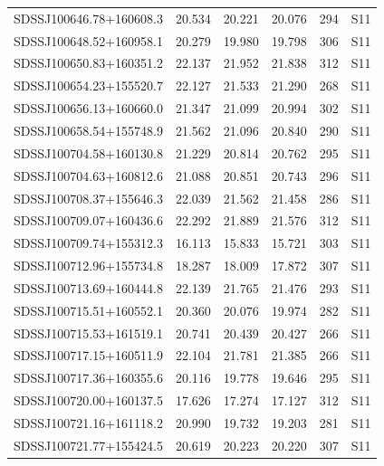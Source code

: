 \documentclass[manuscript]{aastex}
\begin{document}
\begin{table}
\begin{threeparttable}
\begin{center}
{\begin{tabular}{c c c c c c}
     SDSSJ100646.78+160608.3         & 20.534   & 20.221   & 20.076     &  294	& S11     \\
     SDSSJ100648.52+160958.1         & 20.279   & 19.980   & 19.798     &  306	& S11     \\
     SDSSJ100650.83+160351.2         & 22.137   & 21.952   & 21.838     &  312	& S11     \\
     SDSSJ100654.23+155520.7         & 22.127   & 21.533   & 21.290     &  268	& S11     \\
     SDSSJ100656.13+160660.0         & 21.347   & 21.099   & 20.994     &  302	& S11     \\
     SDSSJ100658.54+155748.9         & 21.562   & 21.096   & 20.840     &  290	& S11     \\
     SDSSJ100704.58+160130.8         & 21.229   & 20.814   & 20.762     &  295	& S11     \\
     SDSSJ100704.63+160812.6         & 21.088   & 20.851   & 20.743     &  296	& S11     \\
     SDSSJ100708.37+155646.3         & 22.039   & 21.562   & 21.458     &  286	& S11     \\
     SDSSJ100709.07+160436.6         & 22.292   & 21.889   & 21.576     &  312	& S11     \\
     SDSSJ100709.74+155312.3         & 16.113   & 15.833   & 15.721     &  303	& S11     \\
     SDSSJ100712.96+155734.8         & 18.287   & 18.009   & 17.872     &  307	& S11     \\
     SDSSJ100713.69+160444.8         & 22.139   & 21.765   & 21.476     &  293	& S11     \\
     SDSSJ100715.51+160552.1         & 20.360   & 20.076   & 19.974     &  282	& S11     \\
     SDSSJ100715.53+161519.1         & 20.741   & 20.439   & 20.427     &  266	& S11     \\
     SDSSJ100717.15+160511.9         & 22.104   & 21.781   & 21.385     &  266	& S11     \\
     SDSSJ100717.36+160355.6         & 20.116   & 19.778   & 19.646     &  295	& S11     \\
     SDSSJ100720.00+160137.5         & 17.626   & 17.274   & 17.127     &  312	& S11     \\
     SDSSJ100721.16+161118.2         & 20.990   & 19.732   & 19.203     &  281	& S11     \\
     SDSSJ100721.77+155424.5         & 20.619   & 20.223   & 20.220     &  307	& S11     \\

\end{tabular}}
\end{center}
\end{threeparttable}
\end{table}
\end{document}
